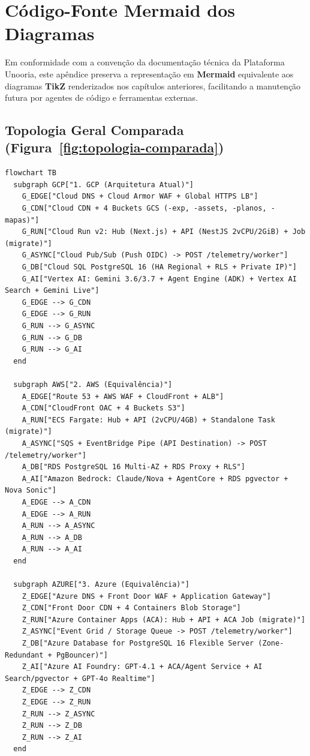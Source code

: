 \chapter{Código-Fonte Mermaid dos Diagramas}
\label{ap:mermaid}

Em conformidade com a convenção da documentação técnica da Plataforma Unooria, este apêndice preserva a representação em \textbf{Mermaid} equivalente aos diagramas \textbf{TikZ} renderizados nos capítulos anteriores, facilitando a manutenção futura por agentes de código e ferramentas externas.

\section{Topologia Geral Comparada (Figura~\ref{fig:topologia-comparada})}

\begin{lstlisting}[language=mermaid, label={lst:mermaid-topologia}]
flowchart TB
  subgraph GCP["1. GCP (Arquitetura Atual)"]
    G_EDGE["Cloud DNS + Cloud Armor WAF + Global HTTPS LB"]
    G_CDN["Cloud CDN + 4 Buckets GCS (-exp, -assets, -planos, -mapas)"]
    G_RUN["Cloud Run v2: Hub (Next.js) + API (NestJS 2vCPU/2GiB) + Job (migrate)"]
    G_ASYNC["Cloud Pub/Sub (Push OIDC) -> POST /telemetry/worker"]
    G_DB["Cloud SQL PostgreSQL 16 (HA Regional + RLS + Private IP)"]
    G_AI["Vertex AI: Gemini 3.6/3.7 + Agent Engine (ADK) + Vertex AI Search + Gemini Live"]
    G_EDGE --> G_CDN
    G_EDGE --> G_RUN
    G_RUN --> G_ASYNC
    G_RUN --> G_DB
    G_RUN --> G_AI
  end

  subgraph AWS["2. AWS (Equivalência)"]
    A_EDGE["Route 53 + AWS WAF + CloudFront + ALB"]
    A_CDN["CloudFront OAC + 4 Buckets S3"]
    A_RUN["ECS Fargate: Hub + API (2vCPU/4GB) + Standalone Task (migrate)"]
    A_ASYNC["SQS + EventBridge Pipe (API Destination) -> POST /telemetry/worker"]
    A_DB["RDS PostgreSQL 16 Multi-AZ + RDS Proxy + RLS"]
    A_AI["Amazon Bedrock: Claude/Nova + AgentCore + RDS pgvector + Nova Sonic"]
    A_EDGE --> A_CDN
    A_EDGE --> A_RUN
    A_RUN --> A_ASYNC
    A_RUN --> A_DB
    A_RUN --> A_AI
  end

  subgraph AZURE["3. Azure (Equivalência)"]
    Z_EDGE["Azure DNS + Front Door WAF + Application Gateway"]
    Z_CDN["Front Door CDN + 4 Containers Blob Storage"]
    Z_RUN["Azure Container Apps (ACA): Hub + API + ACA Job (migrate)"]
    Z_ASYNC["Event Grid / Storage Queue -> POST /telemetry/worker"]
    Z_DB["Azure Database for PostgreSQL 16 Flexible Server (Zone-Redundant + PgBouncer)"]
    Z_AI["Azure AI Foundry: GPT-4.1 + ACA/Agent Service + AI Search/pgvector + GPT-4o Realtime"]
    Z_EDGE --> Z_CDN
    Z_EDGE --> Z_RUN
    Z_RUN --> Z_ASYNC
    Z_RUN --> Z_DB
    Z_RUN --> Z_AI
  end
\end{lstlisting}

